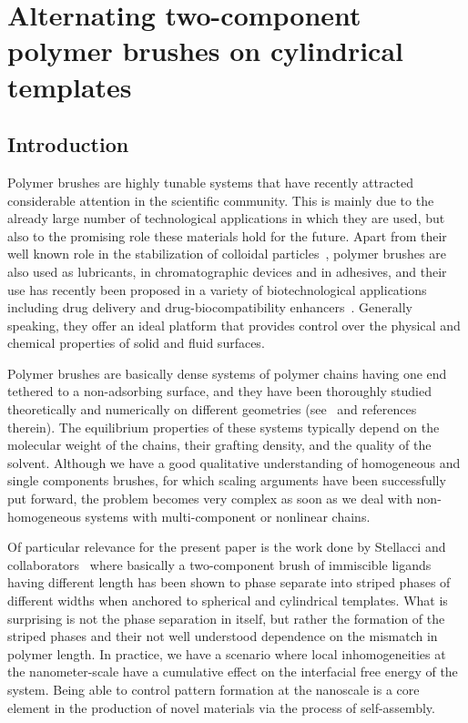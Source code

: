 \chapter{Alternating two-component polymer brushes on cylindrical templates}
\label{chap:brush}

\section{Introduction}
Polymer brushes are highly tunable systems that have recently attracted 
considerable attention in the scientific community. This is mainly due to the 
already large number of technological applications in which they are used, but also to 
the promising role these materials hold for the future. 
Apart from their well known role in the stabilization of colloidal particles~\cite{Napper}, 
polymer brushes are also used as lubricants, in chromatographic devices and in adhesives,
and their use has recently been proposed in a variety of biotechnological applications including
drug delivery and drug-biocompatibility enhancers~\cite{Dragan,Caster,Ponisseril, Stuart}. Generally speaking, they offer an ideal platform that provides 
control over the physical and chemical properties  of solid and fluid surfaces.
 
Polymer brushes are basically dense systems of polymer chains having one end tethered
to a non-adsorbing surface, and they have been thoroughly studied theoretically 
and numerically on different geometries
(see~\cite{Milner,deGennes,BinderBook,Cotton,Alexander,Halperin,CatesPB, Zhulina,RusselPB,BinderPB} and references therein). The equilibrium properties of these systems 
typically depend on the molecular weight of the chains, their grafting density, and the quality 
of the solvent. Although we have a good qualitative understanding of homogeneous and single components 
brushes, for which scaling arguments have been successfully put forward, the problem becomes 
very complex as soon as we   deal  with non-homogeneous systems with multi-component or nonlinear chains.\cite{vanakaras,linse}

Of particular relevance for the present paper is the work done by Stellacci and 
collaborators~\cite{Stellacci1,Stellacci2,Stellacci3,Stellacci4,Stellacci5} where basically a two-component 
brush of immiscible ligands having different length has been shown to phase separate into striped phases of different widths  when anchored to spherical and cylindrical templates. What is surprising is not the phase separation in itself, but rather the formation of the striped phases and their not well understood dependence on the mismatch in polymer length. In practice, we have a scenario where local inhomogeneities at the nanometer-scale 
have a cumulative effect on the interfacial free energy of the system.
Being able to control pattern formation at the nanoscale is a core element in the production 
of novel materials via the process of self-assembly. 

